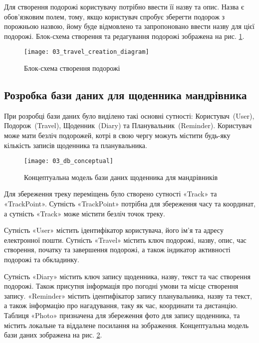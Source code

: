 \documentclass[../main.tex]{subfiles}
\begin{document}
\newpage
Для створення подорожі користувачу потрібно ввести її назву та опис. Назва є обов'язковим полем, тому, якщо користувач спробує зберегти подорож з порожньою назвою, йому буде відмовлено та запропоновано ввести назву для цієї подорожі. Блок-схема створення та редагування подорожі зображена на рис. \ref{diagram:travel_creation}.

\begin{figure}[H]
	\centering
	\texttt{[image: 03\_travel\_creation\_diagram]}
	\caption{Блок-схема створення подорожі}
	\label{diagram:travel_creation}
\end{figure}

\subsection{Розробка бази даних для щоденника мандрівника}

При розробці бази даних було виділено такі основні сутності: Користувач~(User), Подорож~(Travel), Щоденник~(Diary) та Планувальник~(Reminder). Користувач може мати безліч подорожей, котрі в свою чергу можуть містити будь-яку кількість записів щоденника та планувальника.

\begin{figure}[H]
	\centering
	\texttt{[image: 03\_db\_conceptual]}
	\caption{Концептуальна модель бази даних щоденника для мандрівників}
	\label{diagram:db_concept}
\end{figure}

Для збереження треку переміщень було створено сутності «Track» та «TrackPoint». Сутність «TrackPoint» потрібна для збереження часу та координат, а сутність «Track» може містити безліч точок треку.

Сутність «User» містить ідентифікатор користувача, його ім'я та адресу електронної пошти. Сутність «Travel» містить ключ подорожі, назву, опис, час створення, початку та завершення подорожі, а також індикатор активності подорожі та обкладинку.

Сутність «Diary» містить ключ запису щоденника, назву, текст та час створення подорожі. Також присутня інформація про погодні умови та місце створення запису. «Reminder» містить ідентифікатор запису планувальника, назву та текст, а також інформацію про нагадування, таку як час, координати та дистанцію. Таблиця «Photo» призначена для збереження фото для запису щоденника, та містить локальне та віддалене посилання на зображення. Концептуальна модель бази даних зображена на рис. \ref{diagram:db_concept}.
\end{document}
